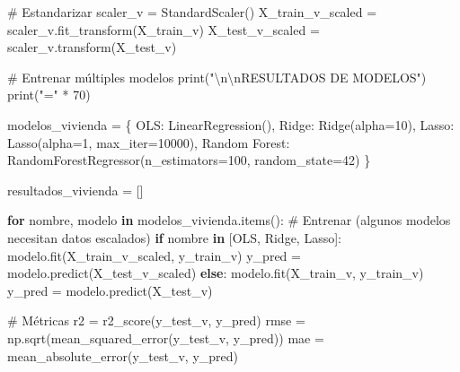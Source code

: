 \documentclass[
  doc,
  floatsintext,
  longtable,
  a4paper,
  nolmodern,
  notxfonts,
  notimes,
  12pt,
  colorlinks=true,linkcolor=blue,citecolor=blue,urlcolor=blue]{apa7}
\newenvironment{Shaded}{\begin{snugshade}}{\end{snugshade}}
\newcommand{\BuiltInTok}[1]{\textcolor[rgb]{0.00,0.23,0.31}{#1}}
\newcommand{\CharTok}[1]{\textcolor[rgb]{0.13,0.47,0.30}{#1}}
\newcommand{\CommentTok}[1]{\textcolor[rgb]{0.37,0.37,0.37}{#1}}
\newcommand{\ControlFlowTok}[1]{\textcolor[rgb]{0.00,0.23,0.31}{\textbf{#1}}}
\newcommand{\DecValTok}[1]{\textcolor[rgb]{0.68,0.00,0.00}{#1}}
\newcommand{\KeywordTok}[1]{\textcolor[rgb]{0.00,0.23,0.31}{\textbf{#1}}}
\newcommand{\NormalTok}[1]{\textcolor[rgb]{0.00,0.23,0.31}{#1}}
\newcommand{\OperatorTok}[1]{\textcolor[rgb]{0.37,0.37,0.37}{#1}}
\newcommand{\StringTok}[1]{\textcolor[rgb]{0.13,0.47,0.30}{#1}}
\begin{document}
\begin{Shaded}
\begin{Highlighting}[]
\CommentTok{\# Estandarizar}
\NormalTok{scaler\_v }\OperatorTok{=}\NormalTok{ StandardScaler()}
\NormalTok{X\_train\_v\_scaled }\OperatorTok{=}\NormalTok{ scaler\_v.fit\_transform(X\_train\_v)}
\NormalTok{X\_test\_v\_scaled }\OperatorTok{=}\NormalTok{ scaler\_v.transform(X\_test\_v)}

\CommentTok{\# Entrenar múltiples modelos}
\BuiltInTok{print}\NormalTok{(}\StringTok{"}\CharTok{\textbackslash{}n\textbackslash{}n}\StringTok{RESULTADOS DE MODELOS"}\NormalTok{)}
\BuiltInTok{print}\NormalTok{(}\StringTok{"="} \OperatorTok{*} \DecValTok{70}\NormalTok{)}

\NormalTok{modelos\_vivienda }\OperatorTok{=}\NormalTok{ \{}
    \StringTok{\textquotesingle{}OLS\textquotesingle{}}\NormalTok{: LinearRegression(),}
    \StringTok{\textquotesingle{}Ridge\textquotesingle{}}\NormalTok{: Ridge(alpha}\OperatorTok{=}\DecValTok{10}\NormalTok{),}
    \StringTok{\textquotesingle{}Lasso\textquotesingle{}}\NormalTok{: Lasso(alpha}\OperatorTok{=}\DecValTok{1}\NormalTok{, max\_iter}\OperatorTok{=}\DecValTok{10000}\NormalTok{),}
    \StringTok{\textquotesingle{}Random Forest\textquotesingle{}}\NormalTok{: RandomForestRegressor(n\_estimators}\OperatorTok{=}\DecValTok{100}\NormalTok{, random\_state}\OperatorTok{=}\DecValTok{42}\NormalTok{)}
\NormalTok{\}}

\NormalTok{resultados\_vivienda }\OperatorTok{=}\NormalTok{ []}

\ControlFlowTok{for}\NormalTok{ nombre, modelo }\KeywordTok{in}\NormalTok{ modelos\_vivienda.items():}
    \CommentTok{\# Entrenar (algunos modelos necesitan datos escalados)}
    \ControlFlowTok{if}\NormalTok{ nombre }\KeywordTok{in}\NormalTok{ [}\StringTok{\textquotesingle{}OLS\textquotesingle{}}\NormalTok{, }\StringTok{\textquotesingle{}Ridge\textquotesingle{}}\NormalTok{, }\StringTok{\textquotesingle{}Lasso\textquotesingle{}}\NormalTok{]:}
\NormalTok{        modelo.fit(X\_train\_v\_scaled, y\_train\_v)}
\NormalTok{        y\_pred }\OperatorTok{=}\NormalTok{ modelo.predict(X\_test\_v\_scaled)}
    \ControlFlowTok{else}\NormalTok{:}
\NormalTok{        modelo.fit(X\_train\_v, y\_train\_v)}
\NormalTok{        y\_pred }\OperatorTok{=}\NormalTok{ modelo.predict(X\_test\_v)}
    
    \CommentTok{\# Métricas}
\NormalTok{    r2 }\OperatorTok{=}\NormalTok{ r2\_score(y\_test\_v, y\_pred)}
\NormalTok{    rmse }\OperatorTok{=}\NormalTok{ np.sqrt(mean\_squared\_error(y\_test\_v, y\_pred))}
\NormalTok{    mae }\OperatorTok{=}\NormalTok{ mean\_absolute\_error(y\_test\_v, y\_pred)}
    

\end{Highlighting}
\end{Shaded}
\end{document}
